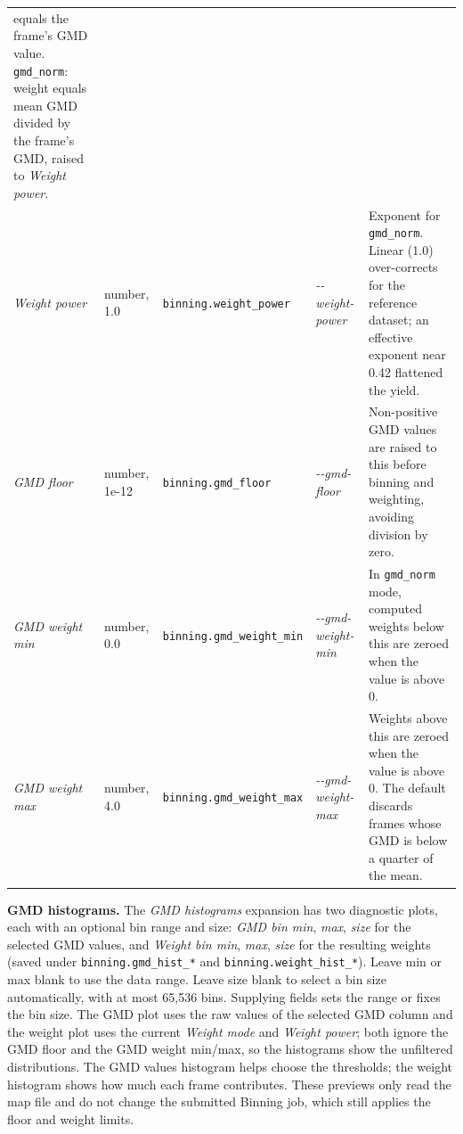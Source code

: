 \documentclass[11pt,a4paper]{article}
\newcommand{\code}[1]{\texttt{#1}}
\begin{document}
\begin{center}
\begin{longtable}{@{}L{3.4cm}L{2.3cm}L{2.5cm}L{2.8cm}L{4.9cm}@{}}
equals the frame's GMD value. \code{gmd\_\allowbreak{}norm}: weight equals mean GMD
divided by the frame's GMD, raised to \emph{Weight power}. \\
\addlinespace
\emph{Weight power} & number, 1.0 & \code{binning.\allowbreak{}weight\_\allowbreak{}power} &
\emph{-\allowbreak{}-\allowbreak{}weight-\allowbreak{}power} & Exponent for \code{gmd\_\allowbreak{}norm}. Linear (1.0)
over-corrects for the reference dataset; an effective exponent near 0.42
flattened the yield. \\
\addlinespace
\emph{GMD floor} & number, 1e-12 & \code{binning.\allowbreak{}gmd\_\allowbreak{}floor} &
\emph{-\allowbreak{}-\allowbreak{}gmd-\allowbreak{}floor} & Non-positive GMD values are raised to this before
binning and weighting, avoiding division by zero. \\
\addlinespace
\emph{GMD weight min} & number, 0.0 & \code{binning.\allowbreak{}gmd\_\allowbreak{}weight\_\allowbreak{}min} &
\emph{-\allowbreak{}-\allowbreak{}gmd-\allowbreak{}weight-\allowbreak{}min} & In \code{gmd\_\allowbreak{}norm} mode, computed weights below
this are zeroed when the value is above 0. \\
\addlinespace
\emph{GMD weight max} & number, 4.0 & \code{binning.\allowbreak{}gmd\_\allowbreak{}weight\_\allowbreak{}max} &
\emph{-\allowbreak{}-\allowbreak{}gmd-\allowbreak{}weight-\allowbreak{}max} & Weights above this are zeroed when the value is
above 0. The default discards frames whose GMD is below a quarter of the
mean. \\
\end{longtable}
\end{center}

\textbf{GMD histograms.} The \emph{GMD histograms} expansion has two
diagnostic plots, each with an optional bin range and size:
\emph{GMD bin min}, \emph{max}, \emph{size} for the selected GMD values, and
\emph{Weight bin min}, \emph{max}, \emph{size} for the resulting weights
(saved under \code{binning.gmd\_\allowbreak{}hist\_\allowbreak{}*} and
\code{binning.weight\_\allowbreak{}hist\_\allowbreak{}*}). Leave min or max
blank to use the data range. Leave size blank to select a bin size automatically,
with at most 65,536 bins. Supplying fields sets the range or fixes
the bin size. The GMD plot uses the raw
values of the selected GMD column and the weight plot uses the current
\emph{Weight mode} and \emph{Weight power}; both ignore the GMD floor and
the GMD weight min/max, so the histograms show the unfiltered distributions.
The GMD values histogram helps choose the thresholds; the weight histogram shows
how much each frame contributes. These previews only read the map file and
do not change the submitted Binning job, which still applies the floor and
weight limits.
\end{document}

